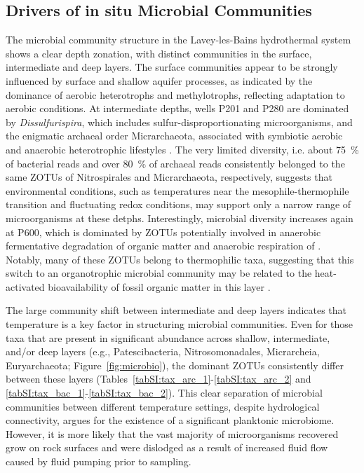 \subsection{Drivers of in situ Microbial Communities}
The microbial community structure in the Lavey-les-Bains hydrothermal system shows a clear depth zonation, with distinct communities in the surface, intermediate and deep layers.
The surface communities appear to be strongly influenced by surface and shallow aquifer processes, as indicated by the dominance of aerobic heterotrophs and methylotrophs, reflecting adaptation to aerobic conditions.
At intermediate depths, wells P201 and P280 are dominated by \textit{Dissulfurispira}, which includes sulfur-disproportionating microorganisms, and the enigmatic archaeal order Micrarchaeota, associated with symbiotic aerobic and anaerobic heterotrophic lifestyles \citep{umezawa2021dissulfurispira, chen2018micrarchaeota, sakai2022micrarchaeota, kadnikov2020micrarachaeota}.
The very limited diversity, i.e. about \SI{75}{\percent} of bacterial reads and over \SI{80}{\percent} of archaeal reads consistently belonged to the same ZOTUs of Nitrospirales and Micrarchaeota, respectively, suggests that environmental conditions, such as temperatures near the mesophile-thermophile transition and fluctuating redox conditions, may support only a narrow range of microorganisms at these detphs.
Interestingly, microbial diversity increases again at P600, which is dominated by ZOTUs potentially involved in anaerobic fermentative degradation of organic matter and anaerobic respiration of .
Notably, many of these ZOTUs belong to thermophilic taxa, suggesting that this switch to an organotrophic microbial community may be related to the heat-activated bioavailability of fossil organic matter in this layer \citep{lagostina2021interactions}.

The large community shift between intermediate and deep layers indicates that temperature is a key factor in structuring microbial communities.
Even for those taxa that are present in significant abundance across shallow, intermediate, and/or deep layers (e.g., Patescibacteria, Nitrosomonadales, Micrarcheia, Euryarchaeota; Figure~\ref{fig:microbio}), the dominant ZOTUs consistently differ between these layers (Tables~\ref{tabSI:tax_arc_1}-\ref{tabSI:tax_arc_2} and \ref{tabSI:tax_bac_1}-\ref{tabSI:tax_bac_2}).
This clear separation of microbial communities between different temperature settings, despite hydrological connectivity, argues for the existence of a significant planktonic microbiome.
However, it is more likely that the vast majority of microorganisms recovered grow on rock surfaces and were dislodged as a result of increased fluid flow caused by fluid pumping prior to sampling.

